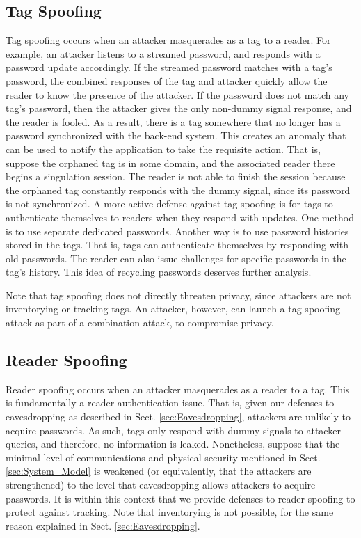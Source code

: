 \subsection{Tag Spoofing}
Tag spoofing occurs when an attacker masquerades as a tag to a reader.  For example, an attacker listens to a streamed password, and responds with a password update accordingly.  If the streamed password matches with a tag's password, the combined responses of the tag and attacker quickly allow the reader to know the presence of the attacker.  If the password does not match any tag's password, then the attacker gives the only non-dummy signal response, and the reader is fooled.  As a result, there is a tag somewhere that no longer has a password synchronized with the back-end system.  This creates an anomaly that can be used to notify the application to take the requisite action.  That is, suppose the orphaned tag is in some domain, and the associated reader there begins a singulation session.  The reader is not able to finish the session because the orphaned tag constantly responds with the dummy signal, since its password is not synchronized.  A more active defense against tag spoofing is for tags to authenticate themselves to readers when they respond with updates.  One method is to use separate dedicated passwords.  Another way is to use password histories stored in the tags.  That is, tags can authenticate themselves by responding with old passwords.  The reader can also issue challenges for specific passwords in the tag's history.  This idea of recycling passwords deserves further analysis.

Note that tag spoofing does not directly threaten privacy, since attackers are not inventorying or tracking tags.  An attacker, however, can launch a tag spoofing attack as part of a combination attack, to compromise privacy.

\subsection{Reader Spoofing}
Reader spoofing occurs when an attacker masquerades as a reader to a tag.  This is fundamentally a reader authentication issue.  That is, given our defenses to eavesdropping as described in Sect. \ref{sec:Eavesdropping}, attackers are unlikely to acquire passwords.  As such, tags only respond with dummy signals to attacker queries, and therefore, no information is leaked.  Nonetheless, suppose that the minimal level of communications and physical security mentioned in Sect. \ref{sec:System_Model} is weakened (or equivalently, that the attackers are strengthened) to the level that eavesdropping allows attackers to acquire passwords.  It is within this context that we provide defenses to reader spoofing to protect against tracking.  Note that inventorying is not possible, for the same reason explained in Sect. \ref{sec:Eavesdropping}.

